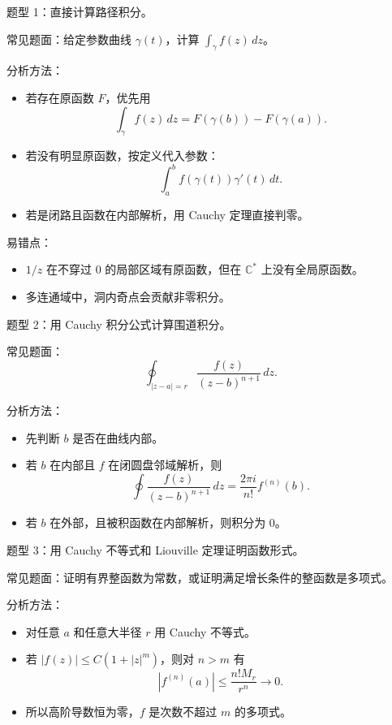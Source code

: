 \documentclass{article}
\begin{document}
题型 1：直接计算路径积分。

常见题面：给定参数曲线 \(\gamma(t)\)，计算
\(\int_\gamma f(z)\,dz\)。

分析方法：

\begin{itemize}
\item
  若存在原函数 $F$，优先用 \[
  \int_\gamma f(z)\,dz=F(\gamma(b))-F(\gamma(a)).
  \]
\item
  若没有明显原函数，按定义代入参数： \[
  \int_a^b f(\gamma(t))\gamma'(t)\,dt.
  \]
\item
  若是闭路且函数在内部解析，用 Cauchy 定理直接判零。
\end{itemize}

易错点：

\begin{itemize}
\item
  $1/z$ 在不穿过 $0$ 的局部区域有原函数，但在
  \(\mathbb C^*\) 上没有全局原函数。
\item
  多连通域中，洞内奇点会贡献非零积分。
\end{itemize}

题型 2：用 Cauchy 积分公式计算围道积分。

常见题面： \[
\oint_{|z-a|=r}\frac{f(z)}{(z-b)^{n+1}}\,dz.
\]

分析方法：

\begin{itemize}
\item
  先判断 $b$ 是否在曲线内部。
\item
  若 $b$ 在内部且 $f$ 在闭圆盘邻域解析，则 \[
  \oint \frac{f(z)}{(z-b)^{n+1}}\,dz
  =\frac{2\pi i}{n!}f^{(n)}(b).
  \]
\item
  若 $b$ 在外部，且被积函数在内部解析，则积分为 $0$。
\end{itemize}

题型 3：用 Cauchy 不等式和 Liouville 定理证明函数形式。

常见题面：证明有界整函数为常数，或证明满足增长条件的整函数是多项式。

分析方法：

\begin{itemize}
\item
  对任意 $a$ 和任意大半径 $r$ 用 Cauchy 不等式。
\item
  若 \(|f(z)|\le C(1+|z|^m)\)，则对
  $n>m$ 有 \[
  |f^{(n)}(a)|\le \frac{n!M_r}{r^n}\to 0.
  \]
\item
  所以高阶导数恒为零，$f$ 是次数不超过 $m$ 的多项式。
\end{itemize}
\end{document}
